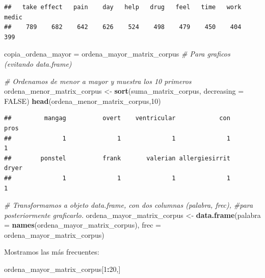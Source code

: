 \documentclass[spanish,]{article}
\newenvironment{Shaded}{\begin{snugshade}}{\end{snugshade}}
\newcommand{\KeywordTok}[1]{\textcolor[rgb]{0.13,0.29,0.53}{\textbf{#1}}}
\newcommand{\DataTypeTok}[1]{\textcolor[rgb]{0.13,0.29,0.53}{#1}}
\newcommand{\DecValTok}[1]{\textcolor[rgb]{0.00,0.00,0.81}{#1}}
\newcommand{\StringTok}[1]{\textcolor[rgb]{0.31,0.60,0.02}{#1}}
\newcommand{\CommentTok}[1]{\textcolor[rgb]{0.56,0.35,0.01}{\textit{#1}}}
\newcommand{\OtherTok}[1]{\textcolor[rgb]{0.56,0.35,0.01}{#1}}
\newcommand{\OperatorTok}[1]{\textcolor[rgb]{0.81,0.36,0.00}{\textbf{#1}}}
\newcommand{\NormalTok}[1]{#1}
\begin{document}
\begin{verbatim}
##   take effect   pain    day   help   drug   feel   time   work  medic 
##    789    682    642    626    524    498    479    450    404    399
\end{verbatim}

\begin{Shaded}
\begin{Highlighting}[]
\NormalTok{copia_ordena_mayor =}\StringTok{ }\NormalTok{ordena_mayor_matrix_corpus }\CommentTok{# Para graficos (evitando data.frame)}

\CommentTok{# Ordenamos de menor a mayor y muestra los 10 primeros}
\NormalTok{ordena_menor_matrix_corpus <-}\StringTok{ }\KeywordTok{sort}\NormalTok{(suma_matrix_corpus, }\DataTypeTok{decreasing =} \OtherTok{FALSE}\NormalTok{)}
\KeywordTok{head}\NormalTok{(ordena_menor_matrix_corpus,}\DecValTok{10}\NormalTok{)}
\end{Highlighting}
\end{Shaded}

\begin{verbatim}
##         mangag          overt    ventricular            con           pros 
##              1              1              1              1              1 
##        ponstel          frank       valerian allergiesirrit          dryer 
##              1              1              1              1              1
\end{verbatim}

\begin{Shaded}
\begin{Highlighting}[]
\CommentTok{# Transformamos a objeto data.frame, con dos columnas (palabra, frec), }
\CommentTok{#para posteriormente graficarlo.}
\NormalTok{ordena_mayor_matrix_corpus <-}\StringTok{ }\KeywordTok{data.frame}\NormalTok{(}\DataTypeTok{palabra =} \KeywordTok{names}\NormalTok{(ordena_mayor_matrix_corpus), }
                                         \DataTypeTok{frec =}\NormalTok{ ordena_mayor_matrix_corpus)}
\end{Highlighting}
\end{Shaded}

Mostramos las más frecuentes:

\begin{Shaded}
\begin{Highlighting}[]
\NormalTok{ordena_mayor_matrix_corpus[}\DecValTok{1}\OperatorTok{:}\DecValTok{20}\NormalTok{,]}
\end{Highlighting}
\end{Shaded}
\end{document}

